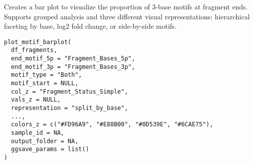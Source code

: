 \documentclass[a4paper]{book}
\begin{document}
%
\begin{Description}
Creates a bar plot to visualize the proportion of 3-base motifs at fragment ends. Supports grouped analysis and
three different visual representations: hierarchical faceting by base, log2 fold change, or side-by-side motifs.
\end{Description}
%
\begin{Usage}
\begin{verbatim}
plot_motif_barplot(
  df_fragments,
  end_motif_5p = "Fragment_Bases_5p",
  end_motif_3p = "Fragment_Bases_3p",
  motif_type = "Both",
  motif_start = NULL,
  col_z = "Fragment_Status_Simple",
  vals_z = NULL,
  representation = "split_by_base",
  ...,
  colors_z = c("#FD96A9", "#E88B00", "#0D539E", "#6CAE75"),
  sample_id = NA,
  output_folder = NA,
  ggsave_params = list()
)
\end{verbatim}
\end{Usage}
%
\end{document}

